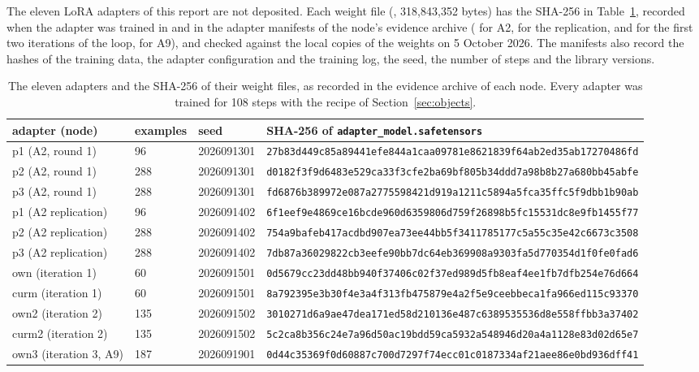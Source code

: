 \documentclass[11pt]{article}
\begin{document}
The eleven LoRA adapters of this report are not deposited. Each weight
file (, 318,843,352 bytes) has the
SHA-256 in Table~\ref{tab:adapters}, recorded when the adapter was trained
in  and in the adapter manifests of
the node's evidence archive ( for A2,
 for the replication,
 and  for the
first two iterations of the loop,  for A9), and
checked against the local copies of the weights on 5 October 2026. The
manifests also record the hashes of the training data, the adapter
configuration and the training log, the seed, the number of steps and the
library versions.

\begin{table}[!htbp]
\centering\scriptsize
\setlength{\tabcolsep}{2pt}
\begin{tabular}{llll}
\toprule
adapter (node) & examples & seed & SHA-256 of \texttt{adapter\_model.safetensors} \\
\midrule
p1 (A2, round 1) & 96 & 2026091301 & \texttt{27b83d449c85a89441efe844a1caa09781e8621839f64ab2ed35ab17270486fd} \\
p2 (A2, round 1) & 288 & 2026091301 & \texttt{d0182f3f9d6483e529ca33f3cfe2ba69bf805b34ddd7a98b8b27a680bb45abfe} \\
p3 (A2, round 1) & 288 & 2026091301 & \texttt{fd6876b389972e087a2775598421d919a1211c5894a5fca35ffc5f9dbb1b90ab} \\
p1 (A2 replication) & 96 & 2026091402 & \texttt{6f1eef9e4869ce16bcde960d6359806d759f26898b5fc15531dc8e9fb1455f77} \\
p2 (A2 replication) & 288 & 2026091402 & \texttt{754a9bafeb417acdbd907ea73ee44bb5f3411785177c5a55c35e42c6673c3508} \\
p3 (A2 replication) & 288 & 2026091402 & \texttt{7db87a36029822cb3eefe90bb7dc64eb369908a9303fa5d770354d1f0fe0fad6} \\
own (iteration 1) & 60 & 2026091501 & \texttt{0d5679cc23dd48bb940f37406c02f37ed989d5fb8eaf4ee1fb7dfb254e76d664} \\
curm (iteration 1) & 60 & 2026091501 & \texttt{8a792395e3b30f4e3a4f313fb475879e4a2f5e9ceebbeca1fa966ed115c93370} \\
own2 (iteration 2) & 135 & 2026091502 & \texttt{3010271d6a9ae47dea171ed58d210136e487c6389535536d8e558ffbb3a37402} \\
curm2 (iteration 2) & 135 & 2026091502 & \texttt{5c2ca8b356c24e7a96d50ac19bdd59ca5932a548946d20a4a1128e83d02d65e7} \\
own3 (iteration 3, A9) & 187 & 2026091901 & \texttt{0d44c35369f0d60887c700d7297f74ecc01c0187334af21aee86e0bd936dff41} \\
\bottomrule
\end{tabular}
\caption{The eleven adapters and the SHA-256 of their weight files, as recorded in the evidence archive of each node. Every adapter was trained for 108 steps with the recipe of Section~\ref{sec:objects}.}
\label{tab:adapters}
\end{table}
\end{document}
